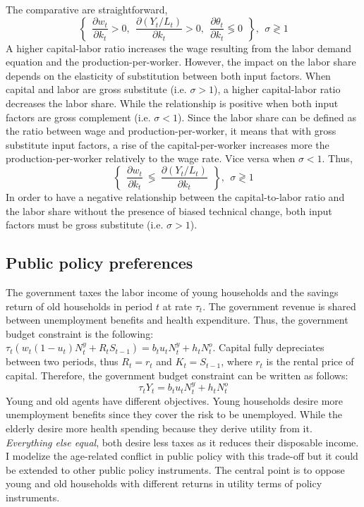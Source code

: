 The comparative are straightforward,
\begin{equation*}
	\left\lbrace ~~
	\frac{\partial w_t}{\partial k_t} > 0,~~
	\frac{\partial (Y_t/L_t)}{\partial k_t} > 0,~~
	\frac{\partial \theta_t}{\partial k_t} \lessgtr 0 ~~
	\right\rbrace, ~~ \sigma \gtrless 1
\end{equation*}
A higher capital-labor ratio increases the wage resulting from the labor demand equation and the production-per-worker. However, the impact on the labor share depends on the elasticity of substitution between both input factors. When capital and labor are gross substitute (i.e. $\sigma > 1$), a higher capital-labor ratio decreases the labor share. While the relationship is positive when both input factors are gross complement (i.e. $\sigma < 1$). Since the labor share can be defined as the ratio between wage and production-per-worker, it means that with gross substitute input factors, a rise of the capital-per-worker increases more the production-per-worker relatively to the wage rate. Vice versa when $\sigma <1$. Thus,
\begin{equation*}
	\left\lbrace ~~
	\frac{\partial w_t}{\partial k_t} ~\lessgtr~ \frac{\partial (Y_t/L_t)}{\partial k_t} ~~
	\right\rbrace, ~~ \sigma \gtrless 1
\end{equation*}
In order to have a negative relationship between the capital-to-labor ratio and the labor share without the presence of biased technical change, both input factors must be gross substitute (i.e. $\sigma >1$).

\subsection{Public policy preferences}\label{subsec:public_policy_preferences}

The government taxes the labor income of young households and the savings return of old households in period $t$ at rate $\tau_t$. The government revenue is shared between unemployment benefits and health expenditure. Thus, the government budget constraint is the following: $\tau_t\left( w_t(1-u_t)N^y_t + R_t S_{t-1} \right) = b_t u_t N^y_t + h_t N^o_t$. Capital fully depreciates between two periods, thus  $R_t = r_t$ and $K_t = S_{t-1}$, where $r_t$ is the rental price of capital. Therefore, the government budget constraint can be written as follows:
\begin{equation} \label{eq:government_bc}
	\tau_t Y_t = b_t u_t N^y_t + h_t N^o_t
\end{equation}
Young and old agents have different objectives. Young households desire more unemployment benefits since they cover the risk to be unemployed. While the elderly desire more health spending because they derive utility from it. \textit{Everything else equal}, both desire less taxes as it reduces their disposable income. I modelize the age-related conflict in public policy with this trade-off but it could be extended to other public policy instruments. The central point is to oppose young and old households with different returns in utility terms of policy instruments.

